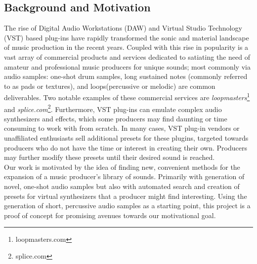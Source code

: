 \documentclass{nime-alternate} %
\begin{document}
\subsection{Background and Motivation}
The rise of Digital Audio Workstations (DAW) \cite{leider2004digital} and Virtual Studio Technology (VST) based plug-ins \cite{tanev2013virtual} have rapidly transformed the sonic and material landscape of music production in the recent years. Coupled with this rise in popularity is a vast array of commercial products and services dedicated to satiating the need of amateur and professional music producers for unique sounds; most commonly via audio samples: one-shot drum samples, long sustained notes (commonly referred to as pads or textures), and loops(percussive or melodic) are common deliverables. Two notable examples of these commercial services are \textit{loopmasters}\footnote{loopmasters.com} and \textit{splice.com}\footnote{splice.com}. Furthermore, VST plug-ins can emulate complex audio synthesizers and effects, which some producers may find daunting or time consuming to work with from scratch. In many cases, VST plug-in vendors or unaffiliated enthusiasts sell additional presets for these plugins, targeted towards producers who do not have the time or interest in creating their own. Producers may further modify these presets until their desired sound is reached.\\
Our work is motivated by the idea of finding new, convenient methods for the expansion of a music producer's library of sounds. Primarily with generation of novel, one-shot audio samples but also with automated search and creation of presets for virtual synthesizers that a producer might find  interesting. Using the generation of short, percussive audio samples as a starting point, this project is a proof of concept for promising avenues towards our motivational goal.\\

\end{document}
